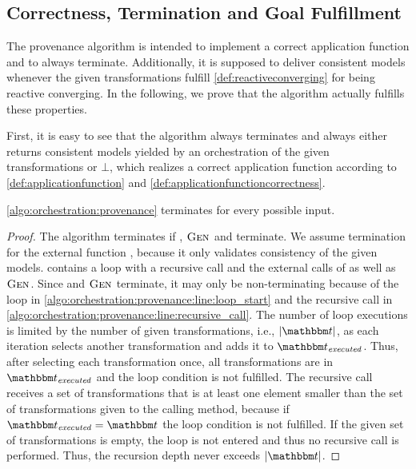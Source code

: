 \subsection{Correctness, Termination and Goal Fulfillment}

The provenance algorithm is intended to implement a correct application function and to always terminate.
Additionally, it is supposed to deliver consistent models whenever the given transformations fulfill \autoref{def:reactiveconverging} for being reactive converging.
In the following, we prove that the algorithm actually fulfills these properties.

First, it is easy to see that the algorithm always terminates and always either returns consistent models yielded by an orchestration of the given transformations or $\bot$, which realizes a correct application function according to \autoref{def:applicationfunction} and \autoref{def:applicationfunctioncorrectness}.

\begin{theorem}
    \autoref{algo:orchestration:provenance} terminates for every possible input.
\end{theorem}
\begin{proof}
    The algorithm terminates if , $\textsc{Gen}_{}$ and  terminate.
    We assume termination for the external function , because it only validates consistency of the given models.
     contains a loop with a recursive call and the external calls of  as well as $\textsc{Gen}_{}$.
    Since  and $\textsc{Gen}_{}$ terminate, it may only be non-terminating because of the loop in \autoref{algo:orchestration:provenance:line:loop_start} and the recursive call in \autoref{algo:orchestration:provenance:line:recursive_call}.
    The number of loop executions is limited by the number of given transformations, i.e., $\abs{\transformationset{T}}$, as each iteration selects another transformation and adds it to $\provalgexecuted$.
    Thus, after selecting each transformation once, all transformations are in $\provalgexecuted$ and the loop condition is not fulfilled.
    The recursive call receives a set of transformations that is at least one element smaller than the set of transformations given to the calling method, because if $\provalgexecuted = \transformationset{T}$ the loop condition is not fulfilled. If the given set of transformations is empty, the loop is not entered and thus no recursive call is performed. Thus, the recursion depth never exceeds $\abs{\transformationset{T}}$.
\end{proof}

